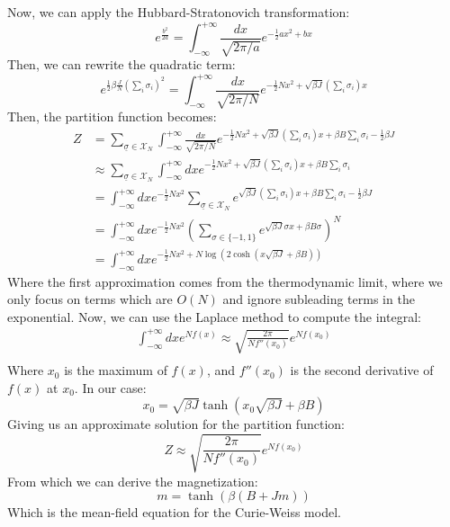 \newpage
Now, we can apply the Hubbard-Stratonovich transformation:
\begin{equation}
    e^{\frac{b^2}{2a}} = \int_{-\infty}^{+\infty}\frac{dx}{\sqrt{2\pi/ a}} e^{-\frac{1}{2}ax^2+bx}
\end{equation}
Then, we can rewrite the quadratic term:
\begin{equation}
    e^{\frac{1}{2}\beta\frac{J}{N}\left(\sum_{i}\sigma_i\right)^2} = \int_{-\infty}^{+\infty}\frac{dx}{\sqrt{2\pi/N}} e^{-\frac{1}{2}Nx^2+\sqrt{\beta J}\left(\sum_i \sigma_i\right)x}
\end{equation}
Then, the partition function becomes:
\begin{equation}
    \begin{aligned}
        Z &= \sum_{\underline{\sigma}\in\mathcal{X}_N}\int_{-\infty}^{+\infty}\frac{dx}{\sqrt{2\pi/N}} e^{-\frac{1}{2}Nx^2+\sqrt{\beta J}\left(\sum_i \sigma_i\right)x+\beta B \sum_i \sigma_i-\frac{1}{2}\beta J} \\
        &\approx \sum_{\underline{\sigma}\in\mathcal{X}_N}\int_{-\infty}^{+\infty}dx e^{-\frac{1}{2}Nx^2+\sqrt{\beta J}\left(\sum_i \sigma_i\right)x+\beta B \sum_i \sigma_i} \\
        &= \int_{-\infty}^{+\infty}dx e^{-\frac{1}{2}Nx^2} \sum_{\underline{\sigma}\in\mathcal{X}_N}e^{\sqrt{\beta J}\left(\sum_i \sigma_i\right)x+\beta B \sum_i \sigma_i-\frac{1}{2}\beta J}\\
        &= \int_{-\infty}^{+\infty}dx e^{-\frac{1}{2}Nx^2} \left(\sum_{\sigma \in \{-1,1\}}e^{\sqrt{\beta J}\sigma x+\beta B \sigma}\right)^N\\
        &=  \int_{-\infty}^{+\infty}dx e^{-\frac{1}{2}Nx^2+N\log\left(2\cosh(x\sqrt{\beta J}+\beta B)\right)}
    \end{aligned}
\end{equation}
Where the first approximation comes from the thermodynamic limit, where we only focus on terms which are $O(N)$ and ignore subleading terms in the exponential. Now, we can use the Laplace method to compute the integral:
\begin{equation}
    \begin{aligned}
        \int_{-\infty}^{+\infty}dx e^{Nf(x)} \approx \sqrt{\frac{2\pi}{Nf''(x_0)}}e^{Nf(x_0)}\\
    \end{aligned}
\end{equation}
Where $x_0$ is the maximum of $f(x)$, and $f''(x_0)$ is the second derivative of $f(x)$ at $x_0$. In our case:
\begin{equation}
    x_0 = \sqrt{\beta J}\tanh(x_0\sqrt{\beta J}+\beta B)
\end{equation}
Giving us an approximate solution for the partition function:
\begin{equation}
    Z \approx \sqrt{\frac{2\pi}{Nf''(x_0)}}e^{Nf(x_0)}
\end{equation}
From which we can derive the magnetization:
\begin{equation}
    m = \tanh(\beta(B+Jm))
\end{equation}
Which is the mean-field equation for the Curie-Weiss model.